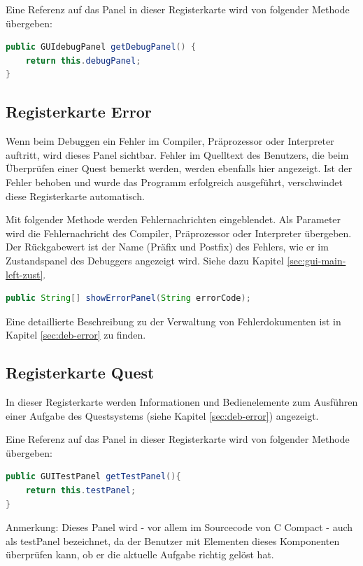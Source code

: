 Eine Referenz auf das Panel in dieser Registerkarte wird von folgender Methode übergeben:
\begin{lstlisting}[language=JAVA]
public GUIdebugPanel getDebugPanel() {
	return this.debugPanel;
}
\end{lstlisting}

\subsection{Registerkarte \glqq{}Error\grqq{}}
\label{sec:gui-main-right-error}
Wenn beim Debuggen ein Fehler im Compiler, Präprozessor oder Interpreter auftritt, wird dieses Panel sichtbar. Fehler im Quelltext des Benutzers, die beim Überprüfen einer Quest bemerkt werden, werden ebenfalls hier angezeigt. Ist der Fehler behoben und wurde das Programm erfolgreich ausgeführt, verschwindet diese Registerkarte automatisch.

Mit folgender Methode werden Fehlernachrichten eingeblendet. Als Parameter wird die Fehlernachricht des Compiler, Präprozessor oder Interpreter übergeben. Der Rückgabewert ist der Name (Präfix und Postfix) des Fehlers, wie er im Zustandspanel des Debuggers angezeigt wird. Siehe dazu Kapitel \ref{sec:gui-main-left-zust}.%
\begin{lstlisting}[language=JAVA]
public String[] showErrorPanel(String errorCode);
\end{lstlisting}

Eine detaillierte Beschreibung zu der Verwaltung von Fehlerdokumenten ist in Kapitel \ref{sec:deb-error} zu finden.

\subsection{Registerkarte \glqq{}Quest\grqq{}}
In dieser Registerkarte werden Informationen und Bedienelemente zum Ausführen einer Aufgabe des Questsystems (siehe Kapitel \ref{sec:deb-error}) angezeigt.

Eine Referenz auf das Panel in dieser Registerkarte wird von folgender Methode übergeben:
\begin{lstlisting}[language=JAVA]
public GUITestPanel getTestPanel(){
	return this.testPanel;
}
\end{lstlisting}

Anmerkung: Dieses Panel wird - vor allem im Sourcecode von C Compact - auch als \glqq{}testPanel\grqq{} bezeichnet, da der Benutzer mit Elementen dieses Komponenten überprüfen kann, ob er die aktuelle Aufgabe richtig gelöst hat.

